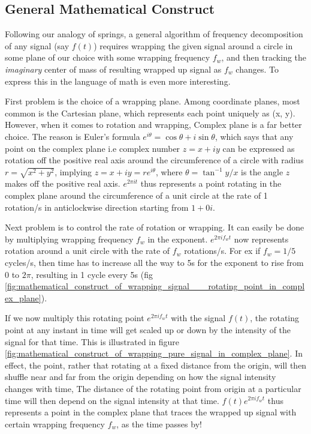 \documentclass[11pt, a4paper]{article}
\newcommand{\quotedsingle}[1]{#1}	%
\newcommand{\quotedsingleit}[1]{\quotedsingle{\textit{#1}}}	%
\begin{document}
	\subsection{General Mathematical Construct}\label{sec:fourier_transform_mathematical_construct}
	Following our analogy of springs, a general algorithm of frequency decomposition of any signal (say $f(t)$) requires wrapping the given signal around a circle in some plane of our choice with some wrapping frequency $f_{w}$, and then tracking the  \quotedsingleit{imaginary} center of mass of resulting wrapped up signal as $f_{w}$ changes. To express this in the language of math is even more interesting.
	
	First problem is the choice of a wrapping plane. Among coordinate planes, most common is the Cartesian plane, which represents each point uniquely as (x, y). However, when it comes to rotation and wrapping, Complex plane is a far better choice. The reason is Euler's formula $e^{i\theta} = \cos\theta + i\sin\theta$, which says that any point on the complex plane i.e complex number $z = x + iy$ can be expressed as rotation off the positive real axis around the circumference of a circle with radius $r = \sqrt{x^2 + y^2}$, implying $z = x + iy = re^{i\theta}$, where $\theta = \tan^{-1}y/x$ is the angle $z$ makes off the positive real axis. $e^{2\pi it}$ thus represents a point rotating in the complex plane around the circumference of a unit circle at the rate of 1 rotation/s in anticlockwise direction starting from $1 + 0i$.
	
	Next problem is to control the rate of rotation or wrapping. It can easily be done by multiplying wrapping frequency $f_{w}$ in the exponent. $e^{2\pi if_{w}t}$ now represents rotation around a unit circle with the rate of $f_{w}$ rotations/s. For ex if $f_{w} = 1/5$ cycles/s, then time has to increase all the way to 5s for the exponent to rise from $0$ to $2\pi$, resulting in 1 cycle every 5s (fig \ref{fig:mathematical_construct_of_wrapping_signal___rotating_point_in_complex_plane}).

	If we now multiply this rotating point $e^{2\pi if_{w}t}$ with the signal $f(t)$, the rotating point at any instant in time will get scaled up or down by the intensity of the signal for that time. This is illustrated in figure \ref{fig:mathematical_construct_of_wrapping_pure_signal_in_complex_plane}. In effect, the point, rather that rotating at a fixed distance from the origin, will then shuffle near and far from the origin depending on how the signal intensity changes with time, The distance of the rotating point from origin at a particular time will then depend on the signal intensity at that time. $f(t)e^{2\pi if_{w}t}$ thus represents a point in the complex plane that traces the wrapped up signal with certain wrapping frequency $f_{w}$, as the time passes by!
	
\end{document}
